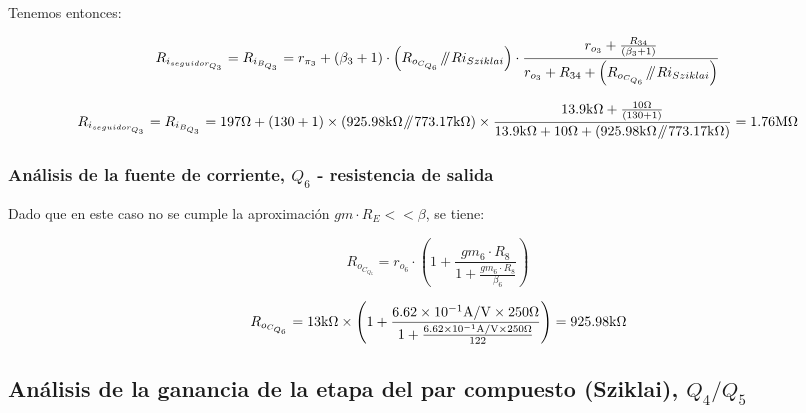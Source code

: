 Tenemos entonces:

\begin{equation}
R_{i_{seguidor_{Q_{3}}}} = R_{i_{B_{Q_{3}}}} = r_{\pi_{3}} + \left( \beta_{3} + 1 \right) \cdot  \left(  R_{o_{C_{Q_{6}}}} \parallelresistors R{i_{Sziklai}}   \right)  \cdot \frac{  r_{o_{3}} + \frac{ R_{34} }{\left( \beta_{3} + 1 \right)} }{  r_{o_{3}} + R_{34} +  \left(  R_{o_{C_{Q_{6}}}} \parallelresistors R{i_{Sziklai}}   \right)  }
\end{equation}


\begin{equation*}
R_{i_{seguidor_{Q_{3}}}} = R_{i_{B_{Q_{3}}}} = 197 \si[per-mode=symbol]{\ohm} + \left( 130 + 1 \right) \times \left(  925.98 \si[per-mode=symbol]{\kilo\ohm} \parallelresistors 773.17 \si[per-mode=symbol]{\kilo\ohm} \right)  \times \frac{  13.9 \si[per-mode=symbol]{\kilo\ohm} + \frac{ 10 \si[per-mode=symbol]{\ohm} }{\left( 130 + 1 \right)} }{  13.9 \si[per-mode=symbol]{\kilo\ohm} + 10 \si[per-mode=symbol]{\ohm} +  \left(  925.98 \si[per-mode=symbol]{\kilo\ohm} \parallelresistors 773.17 \si[per-mode=symbol]{\kilo\ohm} \right)  } = 1.76 \si[per-mode=symbol]{\mega\ohm} 
\end{equation*}


\subsubsection{Análisis de la fuente de corriente, $Q_{6}$ - resistencia de salida}

Dado que en este caso no se cumple la aproximación $gm \cdot R_{E} << \beta$, se tiene:


\begin{equation}
R_{o_{C_{Q_{6}}}} = r_{o_{6}} \cdot \left( 1 + \frac{  gm_{6} \cdot R_{8}  }{  1 + \frac{ gm_{6} \cdot R_{8}  }{ \beta_{6} }   }     \right)
\end{equation}


\begin{equation*}
R_{o_{C_{Q_{6}}}} = 13 \si[per-mode=symbol]{\kilo\ohm} \times \left( 1 + \frac{  \num{6.62E-1} \si[per-mode=symbol]{\ampere\per\volt} \times 250 \si[per-mode=symbol]{\ohm}  }{  1 + \frac{  \num{6.62E-1} \si[per-mode=symbol]{\ampere\per\volt} \times 250 \si[per-mode=symbol]{\ohm}  }{ 122 }   }     \right) = 925.98 \si[per-mode=symbol]{\kilo\ohm}
\end{equation*}



\subsection{Análisis de la ganancia de la etapa del par compuesto (Sziklai), $Q_{4}/Q_{5}$}

